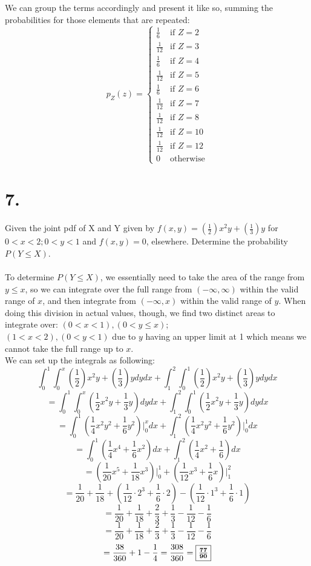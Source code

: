 \documentclass{article}
\begin{document}
{\begin{center}
\begin{tabular}{ | c | c | c | c | }
\end{tabular}
\end{center}
We can group the terms accordingly and present it like so, summing the probabilities for those elements that are repeated:
\[
p_{Z}(z) = \begin{cases}
\frac{1}{6} & \text{if } Z = 2 \\
\frac{1}{12} & \text{if } Z = 3 \\
\frac{1}{6} & \text{if } Z = 4 \\
\frac{1}{12} & \text{if } Z = 5 \\
\frac{1}{6} & \text{if } Z = 6 \\
\frac{1}{12} & \text{if } Z = 7 \\
\frac{1}{12} & \text{if } Z = 8 \\
\frac{1}{12} & \text{if } Z = 10 \\
\frac{1}{12} & \text{if } Z = 12 \\
0 & \text{otherwise}
\end{cases}
\]

\section*{7.}
Given the joint pdf of X and Y given by \( f(x,y) = (\frac{1}{2})x^2y + (\frac{1}{3})y \) for \( 0 < x < 2; 0 < y < 1 \) and \( f(x,y) = 0 \), elsewhere. Determine the probability \( P(Y \leq X) \).
\\
\\
To determine \(P(Y \leq X)\), we essentially need to take the area of the range from \(y \leq x\), so we can integrate over the full range from \((-\infty, \infty)\) within the valid range of \(x\), and then integrate from \((-\infty,x)\) within the valid range of \(y\). When doing this division in actual values, though, we find two distinct areas to integrate over:
\( (0 < x < 1), (0 < y \leq x) \); \\
\( (1 < x < 2), (0 < y < 1) \) due to \(y\) having an upper limit at 1 which means we cannot take the full range up to \(x\). \\
We can set up the integrals as following:
\[
\int_{0}^{1} \int_{0}^{x} (\frac{1}{2})x^2y + (\frac{1}{3})y dy dx + \int_{1}^{2} \int_{0}^{1} (\frac{1}{2})x^2y + (\frac{1}{3})y dy dx
\]
\[
= \int_{0}^{1} \int_{0}^{x} (\frac{1}{2}x^2y + \frac{1}{3}y) dy dx + \int_{1}^{2} \int_{0}^{1} (\frac{1}{2}x^2y + \frac{1}{3}y) dy dx
\]
\[
= \int_{0}^{1} (\frac{1}{4}x^2y^2 + \frac{1}{6}y^2) \Big|_{0}^{x} dx + \int_{1}^{2} (\frac{1}{4}x^2y^2 + \frac{1}{6}y^2) \Big|_{0}^{1} dx
\]
\[
= \int_{0}^{1} (\frac{1}{4}x^4 + \frac{1}{6}x^2) dx + \int_{1}^{2} (\frac{1}{4}x^2 + \frac{1}{6}) dx
\]
\[
= (\frac{1}{20}x^5 + \frac{1}{18}x^3) \Big|_{0}^{1} + (\frac{1}{12}x^3 + \frac{1}{6}x) \Big|_{1}^{2}
\]
\[
= \frac{1}{20} + \frac{1}{18} + (\frac{1}{12} \cdot 2^3 + \frac{1}{6} \cdot 2) - (\frac{1}{12} \cdot 1^3 + \frac{1}{6} \cdot 1)
\]
\[
= \frac{1}{20} + \frac{1}{18} + \frac{2}{3} + \frac{1}{3} - \frac{1}{12} - \frac{1}{6}
\]
\[
= \frac{1}{20} + \frac{1}{18} + \frac{2}{3} + \frac{1}{3} - \frac{1}{12} - \frac{1}{6}
\]
\[
= \frac{38}{360} + 1 - \frac{1}{4} = \frac{308}{360} = \fbox{\(\mathbf{ \frac{77}{90} }\)}
\]

}
\end{document}
